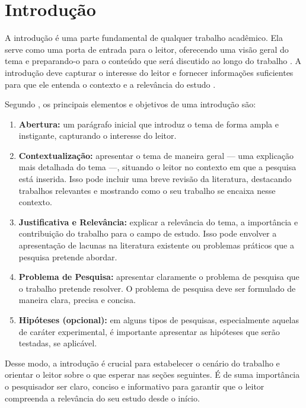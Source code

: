 \section{Introdução}\label{sec:intro}

A introdução é uma parte fundamental de qualquer trabalho acadêmico. Ela serve como uma porta de entrada para o leitor, oferecendo uma visão geral do tema e preparando-o para o conteúdo que será discutido ao longo do trabalho \cite{Marconi2021}. A introdução deve capturar o interesse do leitor e fornecer informações suficientes para que ele entenda o contexto e a relevância do estudo \cite{Wazlawick2021}.

Segundo , os principais elementos e objetivos de uma introdução são:
\begin{enumerate}[label=\alph*), nosep, leftmargin=2.5cm]
    \item \textbf{Abertura:} um parágrafo inicial que introduz o tema de forma ampla e instigante, capturando o interesse do leitor.
    \item \textbf{Contextualização:} apresentar o tema de maneira geral --- uma explicação mais detalhada do tema ---, situando o leitor no contexto em que a pesquisa está inserida. Isso pode incluir uma breve revisão da literatura, destacando trabalhos relevantes e mostrando como o seu trabalho se encaixa nesse contexto.
    \item \textbf{Justificativa e Relevância:} explicar a relevância do tema, a importância e contribuição do trabalho para o campo de estudo. Isso pode envolver a apre\-sentação de lacunas na literatura existente ou problemas práticos que a pesquisa pretende abordar.
    \item \textbf{Problema de Pesquisa:} apresentar claramente o problema de pesquisa que o trabalho pretende resolver. O problema de pesquisa deve ser formulado de maneira clara, precisa e concisa.
    \item \textbf{Hipóteses (opcional):} em alguns tipos de pesquisas, especialmente aquelas de caráter experimental, é importante apresentar as hipóteses que serão testadas, se aplicável.
\end{enumerate}

Desse modo, a introdução é crucial para estabelecer o cenário do trabalho e orientar o leitor sobre o que esperar nas seções seguintes. É de suma importância o pesquisador ser claro, conciso e informativo para garantir que o leitor compreenda a relevância do seu estudo desde o início.